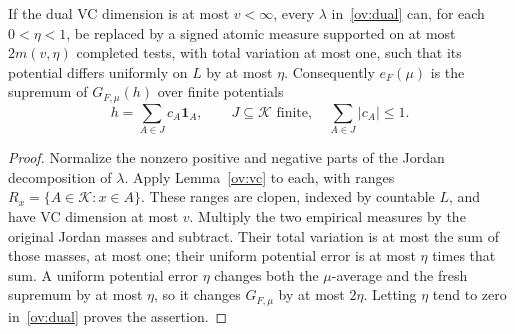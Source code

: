 \begin{corollary}\label{ov:finite-witness}
If the dual VC dimension is at most $v<\infty$, every $\lambda$ in~\eqref{ov:dual} can, for each $0<\eta<1$, be replaced by a signed atomic measure supported on at most $2m(v,\eta)$ completed tests, with total variation at most one, such that its potential differs uniformly on $L$ by at most $\eta$. Consequently $e_F(\mu)$ is the supremum of $G_{F,\mu}(h)$ over finite potentials
\[
 h=\sum_{A\in J}c_A\mathbf1_A,\qquad
 J\subseteq\mathcal K\text{ finite},\quad\sum_{A\in J}|c_A|\le1.
\]
\end{corollary}
\begin{proof}
Normalize the nonzero positive and negative parts of the Jordan decomposition of $\lambda$. Apply Lemma~\ref{ov:vc} to each, with ranges $R_x=\{A\in\mathcal K:x\in A\}$. These ranges are clopen, indexed by countable $L$, and have VC dimension at most $v$. Multiply the two empirical measures by the original Jordan masses and subtract. Their total variation is at most the sum of those masses, at most one; their uniform potential error is at most $\eta$ times that sum. A uniform potential error $\eta$ changes both the $\mu$-average and the fresh supremum by at most $\eta$, so it changes $G_{F,\mu}$ by at most $2\eta$. Letting $\eta$ tend to zero in~\eqref{ov:dual} proves the assertion.
\end{proof}

